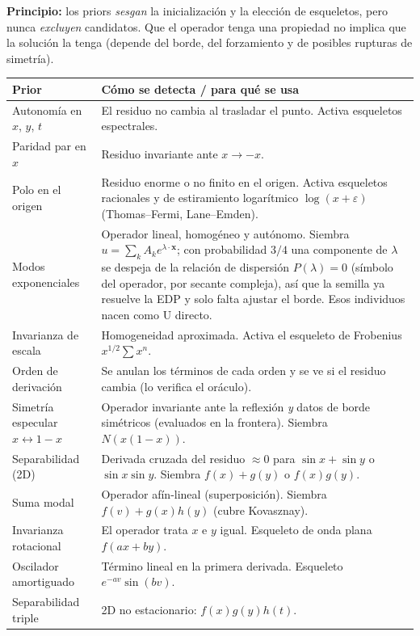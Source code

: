 \documentclass[11pt,a4paper]{article}
\newcommand{\nota}[1]{\par\smallskip\noindent\colorbox{boxbg}{\parbox{\dimexpr\linewidth-2\fboxsep}{\small #1}}\par\smallskip}
\begin{document}
\nota{\textbf{Principio:} los priors \emph{sesgan} la inicialización y la elección de esqueletos, pero
nunca \emph{excluyen} candidatos. Que el operador tenga una propiedad no implica que la solución la
tenga (depende del borde, del forzamiento y de posibles rupturas de simetría).}

{\small
\begin{longtable}{@{}p{4.2cm}p{11cm}@{}}
\toprule\textbf{Prior} & \textbf{Cómo se detecta / para qué se usa}\\\midrule\endhead
Autonomía en $x$, $y$, $t$ & El residuo no cambia al trasladar el punto. Activa esqueletos espectrales.\\
Paridad par en $x$ & Residuo invariante ante $x\to-x$.\\
Polo en el origen & Residuo enorme o no finito en el origen. Activa esqueletos racionales y de
estiramiento logarítmico $\log(x+\varepsilon)$ (Thomas--Fermi, Lane--Emden).\\
Modos exponenciales & Operador lineal, homogéneo y autónomo. Siembra $u=\sum_k A_k e^{\lambda\cdot\mathbf x}$;
con probabilidad $3/4$ una componente de $\lambda$ se despeja de la relación de dispersión
$P(\lambda)=0$ (símbolo del operador, por secante compleja), así que la semilla ya resuelve la EDP y
solo falta ajustar el borde. Esos individuos nacen como U directo.\\
Invarianza de escala & Homogeneidad aproximada. Activa el esqueleto de Frobenius $x^{1/2}\sum x^n$.\\
Orden de derivación & Se anulan los términos de cada orden y se ve si el residuo cambia (lo verifica el oráculo).\\
Simetría especular $x\leftrightarrow1-x$ & Operador invariante ante la reflexión \emph{y} datos de borde
simétricos (evaluados en la frontera). Siembra $N(x(1-x))$.\\
Separabilidad (2D) & Derivada cruzada del residuo $\approx0$ para $\sin x+\sin y$ o $\sin x\sin y$. Siembra $f(x)+g(y)$ o $f(x)g(y)$.\\
Suma modal & Operador afín-lineal (superposición). Siembra $f(v)+g(x)h(y)$ (cubre Kovasznay).\\
Invarianza rotacional & El operador trata $x$ e $y$ igual. Esqueleto de onda plana $f(ax+by)$.\\
Oscilador amortiguado & Término lineal en la primera derivada. Esqueleto $e^{-av}\sin(bv)$.\\
Separabilidad triple & 2D no estacionario: $f(x)g(y)h(t)$.\\\bottomrule
\end{longtable}}
\end{document}
